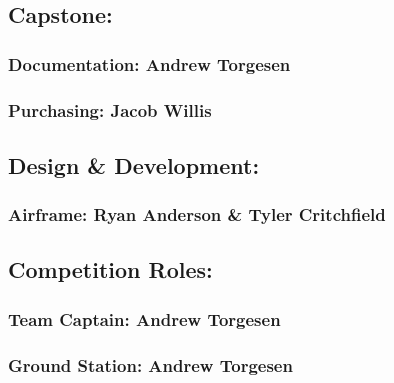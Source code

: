 \documentclass[]{auvsi_doc}
\begin{document}
\hypertarget{h.d645jwbpz1js}{\subsection{\texorpdfstring{{Capstone:}}{Capstone:}}\label{h.d645jwbpz1js}}

\hypertarget{h.p8pvzhwgals7}{\subsubsection{\texorpdfstring{{Documentation:
Andrew
Torgesen}}{Documentation: Andrew Torgesen}}\label{h.p8pvzhwgals7}}

\hypertarget{h.4u5ohftr3ivt}{\subsubsection{\texorpdfstring{{Purchasing:
Jacob Willis}}{Purchasing: Jacob Willis}}\label{h.4u5ohftr3ivt}}

\hypertarget{h.hdq7osdifj4b}{\subsection{\texorpdfstring{{Design \&
Development:}}{Design \& Development:}}\label{h.hdq7osdifj4b}}

\hypertarget{h.ksxlyips5td6}{\subsubsection{\texorpdfstring{{Airframe:
Ryan Anderson \& Tyler
Critchfield}}{Airframe: Ryan Anderson \& Tyler Critchfield}}\label{h.ksxlyips5td6}}

\hypertarget{h.uewzmm294rc5}{\subsection{\texorpdfstring{{Competition
Roles:}}{Competition Roles:}}\label{h.uewzmm294rc5}}

\hypertarget{h.g1aru5oodxem}{\subsubsection{\texorpdfstring{{Team
Captain: Andrew
Torgesen}}{Team Captain: Andrew Torgesen}}\label{h.g1aru5oodxem}}

\hypertarget{h.v9u227xrzjux}{\subsubsection{\texorpdfstring{{Ground
Station: Andrew
Torgesen}}{Ground Station: Andrew Torgesen}}\label{h.v9u227xrzjux}}
\end{document}
